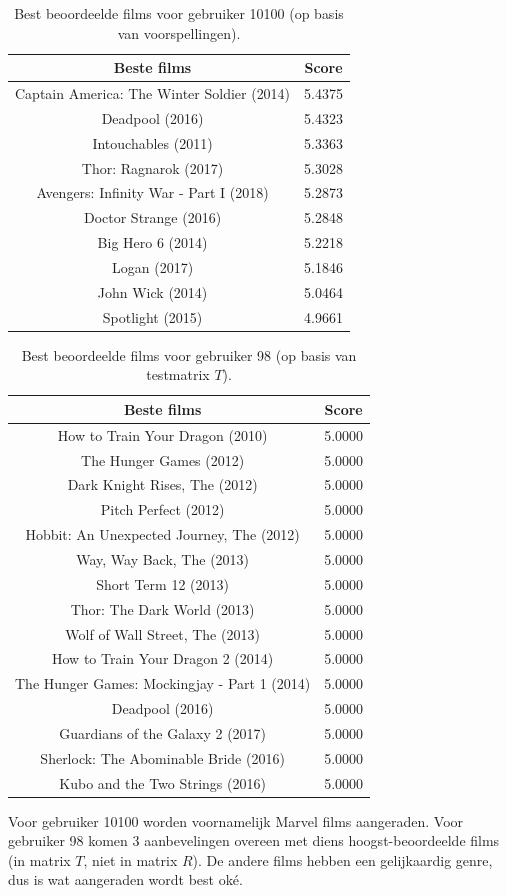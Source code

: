 \begin{table}[H]
\centering
\begin{tabular}{c|c}
\textbf{Beste films} & \textbf{Score} \\
\hline
    Captain America: The Winter Soldier (2014) & 5.4375 \\
    Deadpool (2016)                            & 5.4323 \\
    Intouchables (2011)                        & 5.3363 \\
    Thor: Ragnarok (2017)                      & 5.3028 \\
    Avengers: Infinity War - Part I (2018)     & 5.2873 \\
    Doctor Strange (2016)                      & 5.2848 \\
    Big Hero 6 (2014)                          & 5.2218 \\
    Logan (2017)                               & 5.1846 \\
    John Wick (2014)                           & 5.0464 \\
    Spotlight (2015)                           & 4.9661 
\end{tabular}
\caption{Best beoordeelde films voor gebruiker 10100 (op basis van voorspellingen).}
\label{fig:op18b}
\end{table}

\begin{table}[H]
\centering
\begin{tabular}{c|c}
\textbf{Beste films} & \textbf{Score} \\
\hline
How to Train Your Dragon (2010)             & 5.0000 \\
The Hunger Games (2012)                     & 5.0000 \\
Dark Knight Rises, The (2012)               & 5.0000 \\
Pitch Perfect (2012)                        & 5.0000 \\
Hobbit: An Unexpected Journey, The (2012)   & 5.0000 \\
Way, Way Back, The (2013)                   & 5.0000 \\
Short Term 12 (2013)                        & 5.0000 \\
Thor: The Dark World (2013)                 & 5.0000 \\
Wolf of Wall Street, The (2013)             & 5.0000 \\
How to Train Your Dragon 2 (2014)           & 5.0000 \\
The Hunger Games: Mockingjay - Part 1 (2014)& 5.0000 \\
Deadpool (2016)                             & 5.0000 \\
Guardians of the Galaxy 2 (2017)            & 5.0000 \\
Sherlock: The Abominable Bride (2016)       & 5.0000 \\
Kubo and the Two Strings (2016)             & 5.0000
\end{tabular}
\caption{Best beoordeelde films voor gebruiker 98 (op basis van testmatrix $T$).}
\label{fig:op18c}
\end{table}

\noindent Voor gebruiker 10100 worden voornamelijk Marvel films aangeraden. Voor gebruiker 98 komen 3 aanbevelingen overeen met diens hoogst-beoordeelde films (in matrix $T$, niet in matrix $R$). De andere films hebben een gelijkaardig genre, dus is wat aangeraden wordt best ok\'e.


